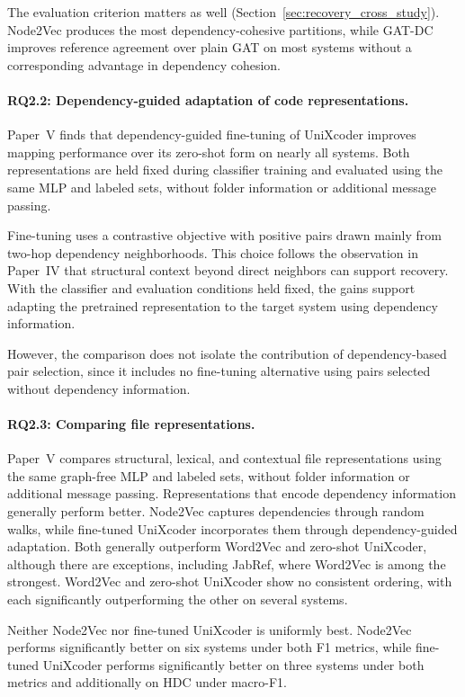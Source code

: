 The evaluation criterion matters as well (Section~\ref{sec:recovery_cross_study}). Node2Vec produces the most dependency-cohesive partitions, while GAT-DC improves reference agreement over plain GAT on most systems without a corresponding advantage in dependency cohesion.

\paragraph{RQ2.2: Dependency-guided adaptation of code representations.} Paper~V finds that dependency-guided fine-tuning of UniXcoder improves mapping performance over its zero-shot form on nearly all systems. Both representations are held fixed during classifier training and evaluated using the same MLP and labeled sets, without folder information or additional message passing.

Fine-tuning uses a contrastive objective with positive pairs drawn mainly from two-hop dependency neighborhoods. This choice follows the observation in Paper~IV that structural context beyond direct neighbors can support recovery. With the classifier and evaluation conditions held fixed, the gains support adapting the pretrained representation to the target system using dependency information.

However, the comparison does not isolate the contribution of dependency-based pair selection, since it includes no fine-tuning alternative using pairs selected without dependency information.

\paragraph{RQ2.3: Comparing file representations.} Paper~V compares structural, lexical, and contextual file representations using the same graph-free MLP and labeled sets, without folder information or additional message passing. Representations that encode dependency information generally perform better. Node2Vec captures dependencies through random walks, while fine-tuned UniXcoder incorporates them through dependency-guided adaptation. Both generally outperform Word2Vec and zero-shot UniXcoder, although there are exceptions, including JabRef, where Word2Vec is among the strongest. Word2Vec and zero-shot UniXcoder show no consistent ordering, with each significantly outperforming the other on several systems.

Neither Node2Vec nor fine-tuned UniXcoder is uniformly best. Node2Vec performs significantly better on six systems under both F1 metrics, while fine-tuned UniXcoder performs significantly better on three systems under both metrics and additionally on HDC under macro-F1.

